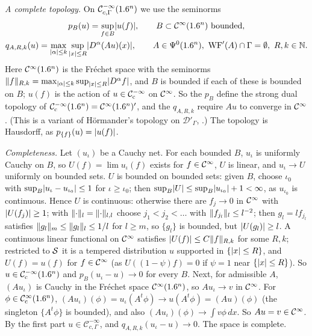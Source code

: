 \emph{A complete topology.} On $\mathcal C^{-\infty}_{c,\Gamma}(1.6^n)$ we use the seminorms
\begin{gather*}
  p_B(u)=\sup_{f\in B}\lvert u(f)\rvert,\qquad B\subset\mathcal{C}^\infty(1.6^n)\text{ bounded},\\
  q_{A,R,k}(u)=\max_{\lvert \alpha\rvert\le k}\sup_{\lvert x\rvert\le R}\lvert D^\alpha(Au)(x)\rvert,\qquad
  A\in\Psi^{0}(1.6^n),\ \operatorname{WF}'(A)\cap\Gamma=\emptyset,\ R,k\in\mathbb{N}.
\end{gather*}
Here $\mathcal{C}^\infty(1.6^n)$ is the Fréchet space with the seminorms
$\lVert f\rVert_{R,k}=\max_{\lvert \alpha\rvert\le k}\sup_{\lvert x\rvert\le R}\lvert D^\alpha f\rvert$, and $B$ is bounded if each of
these is bounded on $B$; $u(f)$ is the action of $u\in\mathcal{C}^{-\infty}_{\mathrm{c}}$ on $\mathcal{C}^\infty$. So the $p_B$ define the
strong dual topology of $\mathcal{C}^{-\infty}_{\mathrm{c}}(1.6^n)=\mathcal{C}^\infty(1.6^n)'$, and the $q_{A,R,k}$ require $Au$ to converge in
$\mathcal{C}^\infty$. (This is a variant of H\"ormander's topology on $\mathcal D'_\Gamma$,
\cite[Section~8.2]{Hormander-I}.) The topology is Hausdorff, as $p_{\{f\}}(u)=\lvert u(f)\rvert$.

\emph{Completeness.} Let $(u_\iota)$ be a Cauchy net. For each bounded $B$, $u_\iota$ is uniformly
Cauchy on $B$, so $U(f)=\lim u_\iota(f)$ exists for $f\in\mathcal{C}^\infty$, $U$ is linear, and
$u_\iota\to U$ uniformly on bounded sets. $U$ is bounded on bounded sets: given $B$, choose
$\iota_0$ with $\sup_B\lvert u_\iota-u_{\iota_0}\rvert\le1$ for $\iota\ge\iota_0$; then
$\sup_B\lvert U\rvert\le\sup_B\lvert u_{\iota_0}\rvert+1<\infty$, as $u_{\iota_0}$ is continuous. Hence $U$ is continuous:
otherwise there are $f_j\to0$ in $\mathcal{C}^\infty$ with $\lvert U(f_j)\rvert\ge1$; with $\lVert \cdot\rVert_{l}=\lVert \cdot\rVert_{l,l}$
choose $j_1<j_2<\dots$ with $\lVert f_{j_l}\rVert_l\le l^{-2}$; then $g_l=lf_{j_l}$ satisfies
$\lVert g_l\rVert_m\le\lVert g_l\rVert_l\le1/l$ for $l\ge m$, so $\{g_l\}$ is bounded, but $\lvert U(g_l)\rvert\ge l$.
A continuous linear functional on $\mathcal{C}^\infty$ satisfies $\lvert U(f)\rvert\le C\lVert f\rVert_{R,k}$ for some $R,k$;
restricted to $\mathcal{S}$ it is a tempered distribution $u$ supported in $\{\lvert x\rvert\le R\}$, and
$U(f)=u(f)$ for $f\in\mathcal{C}^\infty$ (as $U((1-\psi)f)=0$ if $\psi=1$ near $\{\lvert x\rvert\le R\}$). So $u\in\mathcal{C}^{-\infty}_{\mathrm{c}}(1.6^n)$
and $p_B(u_\iota-u)\to0$ for every $B$. Next, for admissible $A$, $(Au_\iota)$ is Cauchy in the
Fréchet space $\mathcal{C}^\infty(1.6^n)$, so $Au_\iota\to v$ in $\mathcal{C}^\infty$. For $\phi\in\mathcal{C}^\infty_{\mathrm{c}}(1.6^n)$,
$(Au_\iota)(\phi)=u_\iota(A^t\phi)\to u(A^t\phi)=(Au)(\phi)$ (the singleton $\{A^t\phi\}$ is bounded),
and also $(Au_\iota)(\phi)\to\int v\phi\,dx$. So $Au=v\in\mathcal{C}^\infty$. By the first part
$u\in\mathcal C^{-\infty}_{c,\Gamma}$, and $q_{A,R,k}(u_\iota-u)\to0$. The space is complete.

